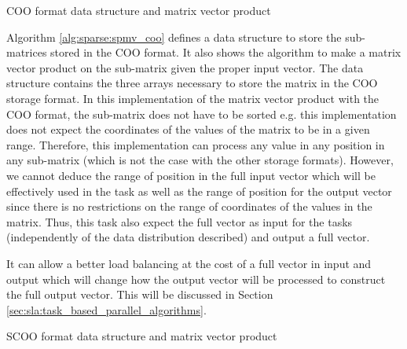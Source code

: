 \begin{algorithm}[h]
	\DontPrintSemicolon
	\SetAlgoVlined
	\caption{COO format data structure and matrix vector product\label{alg:sparse:spmv_coo}}

	\;
\end{algorithm}

Algorithm \ref{alg:sparse:spmv_coo} defines a data structure to store the sub-matrices stored in the COO format.
It also shows the algorithm to make a matrix vector product on the sub-matrix given the proper input vector.
The data structure contains the three arrays necessary to store the matrix in the COO storage format.
In this implementation of the matrix vector product with the COO format, the sub-matrix does not have to be sorted e.g. this implementation does not expect the coordinates of the values of the matrix to be in a given range.
Therefore, this implementation can process any value in any position in any sub-matrix (which is not the case with the other storage formats).
However, we cannot deduce the range of position in the full input vector which will be effectively used in the task as well as the range of position for the output vector since there is no restrictions on the range of coordinates of the values in the matrix.
Thus, this task also expect the full vector as input for the tasks (independently of the data distribution described) and output a full vector.

It can allow a better load balancing at the cost of a full vector in input and output which will change how the output vector will be processed to construct the full output vector.
This will be discussed in Section \ref{sec:sla:task_based_parallel_algorithms}.


\begin{algorithm}[h]
	\DontPrintSemicolon
	\SetAlgoVlined
	\caption{SCOO format data structure and matrix vector product\label{alg:sparse:spmv_scoo}}

	\;
\end{algorithm}

